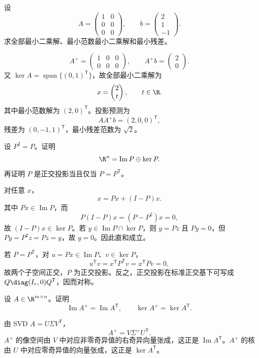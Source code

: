 \begin{exercise}[level=standard]
设
\[
A=\begin{pmatrix}1&0\\0&0\\0&0\end{pmatrix},
\qquad
b=\begin{pmatrix}2\\1\\-1\end{pmatrix}.
\]
求全部最小二乘解、最小范数最小二乘解和最小残差。
\begin{solution}
\[
A^+=\begin{pmatrix}1&0&0\\0&0&0\end{pmatrix},
\qquad
A^+b=\begin{pmatrix}2\\0\end{pmatrix}.
\]
又 $\ker A=\operatorname{span}\{(0,1)^{\mathsf T}\}$，故全部最小二乘解为
\[
x=\begin{pmatrix}2\\t\end{pmatrix},
\qquad t\in\R.
\]
其中最小范数解为 $(2,0)^{\mathsf T}$。投影预测为
\[
AA^+b=(2,0,0)^{\mathsf T},
\]
残差为 $(0,-1,1)^{\mathsf T}$，最小残差范数为 $\sqrt2$。
\end{solution}
\end{exercise}

\begin{exercise}[level=standard]
设 $P^2=P$。证明
\[
\R^n=\operatorname{Im}P\oplus\ker P.
\]
再证明 $P$ 是正交投影当且仅当 $P=P^{\mathsf T}$。
\begin{solution}
对任意 $x$，
\[
x=Px+(I-P)x.
\]
其中 $Px\in\operatorname{Im}P$，而
\[
P(I-P)x=(P-P^2)x=0,
\]
故 $(I-P)x\in\ker P$。若 $y\in\operatorname{Im}P\cap\ker P$，则 $y=Pz$ 且 $Py=0$，但
$Py=P^2z=Pz=y$，故 $y=0$。因此直和成立。

若 $P=P^{\mathsf T}$，对 $u=Px\in\operatorname{Im}P$、$v\in\ker P$，
\[
u^{\mathsf T}v=x^{\mathsf T}P^{\mathsf T}v=x^{\mathsf T}Pv=0,
\]
故两个子空间正交，$P$ 为正交投影。反之，正交投影在标准正交基下可写成 $Q\diag(I_r,0)Q^{\mathsf T}$，因而对称。
\end{solution}
\end{exercise}

\begin{exercise}[level=standard]
设 $A\in\R^{m\times n}$。证明
\[
\operatorname{Im}A^+=\operatorname{Im}A^{\mathsf T},
\qquad
\ker A^+=\ker A^{\mathsf T}.
\]
\begin{solution}
由 SVD $A=U\Sigma V^{\mathsf T}$，
\[
A^+=V\Sigma^+U^{\mathsf T}.
\]
$A^+$ 的像空间由 $V$ 中对应非零奇异值的右奇异向量张成，这正是 $\operatorname{Im}A^{\mathsf T}$。$A^+$ 的核由 $U$ 中对应零奇异值的向量张成，这正是
$\ker A^{\mathsf T}$。
\end{solution}
\end{exercise}

